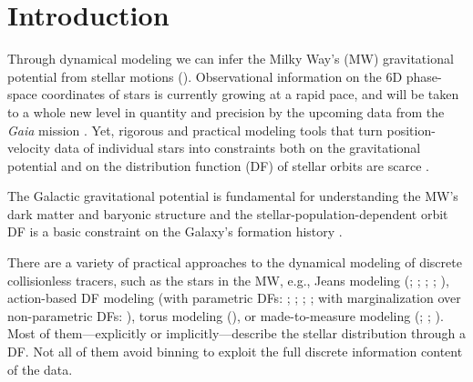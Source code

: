 \documentclass[iop,revtex4,numberedappendix,appendixfloats]{emulateapj}
\begin{document}

\section{Introduction} \label{sec:intro}

Through dynamical modeling we can infer the Milky Way's (MW) gravitational potential from stellar motions (\citealt{2008gady.book.....B,2011Prama..77...39B,2013A&ARv..21...61R}). Observational information on the 6D phase-space coordinates of stars is currently growing at a rapid pace, and will be taken to a whole new level in quantity and precision by the upcoming data from the \emph{Gaia} mission \citep{2001A&A...369..339P}. Yet, rigorous and practical modeling tools that turn position-velocity data of individual stars into constraints both on the gravitational potential and on the distribution function (DF) of stellar orbits are scarce \citep{2013A&ARv..21...61R}.

The Galactic gravitational potential is fundamental for understanding the MW's dark matter and baryonic structure \citep{2012sf2a.conf...15F,2013A&ARv..21...61R,2013PhR...531....1S,2014JPhG...41f3101R} and the stellar-population-dependent orbit DF is a basic constraint on the Galaxy's formation history \citep{2013NewAR..57...29B,2015MNRAS.449.3479S}.

There are a variety of practical approaches to the dynamical modeling of discrete collisionless tracers, such as the stars in the MW, e.g., Jeans modeling (\citealt{1989MNRAS.239..605K}; \citealt{2012ApJ...756...89B}; \citealt{2012MNRAS.425.1445G}; \citealt{2013ApJ...772..108Z}; \citealt{2015MNRAS.452..956B}), action-based DF modeling (with parametric DFs: \citealt{2013ApJ...779..115B}; \citealt{2014MNRAS.445.3133P}; \citealt{2015MNRAS.449.3479S}; \citealt{2016MNRAS.tmp..817D}; with marginalization over non-parametric DFs: \citealt{2014MNRAS.437.2230M}), torus modeling (\citealt{2008MNRAS.390..429M,2012MNRAS.419.2251M,2013MNRAS.433.1411M}), or made-to-measure modeling (\citealt{1996MNRAS.282..223S}; \citealt{2007MNRAS.376...71D}; \citealt{2014MNRAS.443.2112H}). Most of them---explicitly or implicitly---describe the stellar distribution through a DF. Not all of them avoid binning to exploit the full discrete information content of the data.
\end{document}
